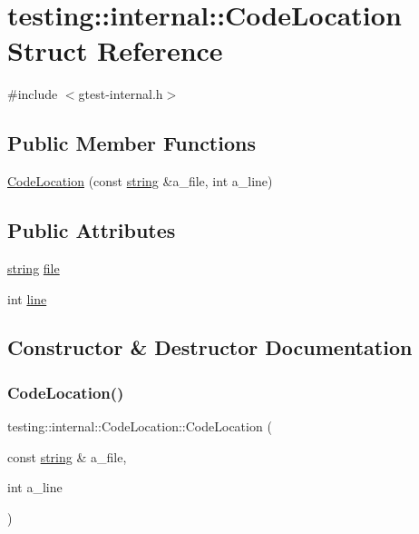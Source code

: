 \hypertarget{structtesting_1_1internal_1_1_code_location}{}\section{testing\+::internal\+::Code\+Location Struct Reference}
\label{structtesting_1_1internal_1_1_code_location}


{\ttfamily \#include $<$gtest-\/internal.\+h$>$}

\subsection*{Public Member Functions}
\begin{DoxyCompactItemize}
\item 
\mbox{\hyperlink{structtesting_1_1internal_1_1_code_location_ade3ecb2a54905619cd40a6856b48cd5a}{Code\+Location}} (const \mbox{\hyperlink{namespacetesting_1_1internal_a8e8ff5b11e64078831112677156cb111}{string}} \&a\+\_\+file, int a\+\_\+line)
\end{DoxyCompactItemize}
\subsection*{Public Attributes}
\begin{DoxyCompactItemize}
\item 
\mbox{\hyperlink{namespacetesting_1_1internal_a8e8ff5b11e64078831112677156cb111}{string}} \mbox{\hyperlink{structtesting_1_1internal_1_1_code_location_ab8a24d5e63295e411d37578dbb9427c0}{file}}
\item 
int \mbox{\hyperlink{structtesting_1_1internal_1_1_code_location_a01c977c7e8834a05a6d6c40b0c416045}{line}}
\end{DoxyCompactItemize}


\subsection{Constructor \& Destructor Documentation}
\mbox{\label{structtesting_1_1internal_1_1_code_location_ade3ecb2a54905619cd40a6856b48cd5a}} 
\subsubsection{\texorpdfstring{CodeLocation()}{CodeLocation()}}
{\footnotesize\ttfamily testing\+::internal\+::\+Code\+Location\+::\+Code\+Location (\begin{DoxyParamCaption}\item[{const \mbox{\hyperlink{namespacetesting_1_1internal_a8e8ff5b11e64078831112677156cb111}{string}} \&}]{a\+\_\+file,  }\item[{int}]{a\+\_\+line }\end{DoxyParamCaption})\hspace{0.3cm}{\ttfamily [inline]}}



